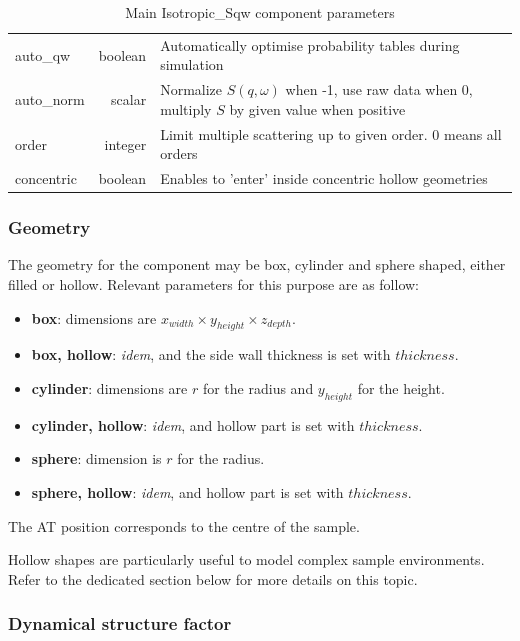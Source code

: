 \begin{table}
\begin{center}
{\begin{tabular}{|lr|p{}|}
auto\_qw  & boolean & Automatically optimise probability tables during simulation  \\
auto\_norm& scalar  & Normalize $S(q,\omega)$ when -1, use raw data when 0, multiply $S$ by given value when positive \\
order     & integer & Limit multiple scattering up to given order. 0 means all orders  \\
concentric& boolean & Enables to 'enter' inside concentric hollow geometries  \\
    \hline
    \end{tabular}
    \caption{Main Isotropic\_Sqw component parameters}
    \label{t:sqw-param}
  }
  \end{center}
\end{table}

\subsubsection{Geometry}

The geometry for the component may be box, cylinder and sphere shaped, either filled or hollow. Relevant parameters for this purpose are as follow:
\begin{itemize}
\item \textbf{box}: dimensions are $x_{width} \times y_{height} \times z_{depth}$.
\item \textbf{box, hollow}: \emph{idem}, and the side wall thickness is set with $thickness$.
\item \textbf{cylinder}: dimensions are $r$ for the radius and $y_{height}$ for the height.
\item \textbf{cylinder, hollow}: \emph{idem}, and hollow part is set with $thickness$.
\item \textbf{sphere}: dimension is $r$ for the radius.
\item \textbf{sphere, hollow}: \emph{idem}, and hollow part is set with $thickness$.
\end{itemize}
The AT position corresponds to the centre of the sample.

Hollow shapes are particularly useful to model complex sample environments. Refer to the dedicated section below for more details on this topic.

\subsubsection{Dynamical structure factor}

